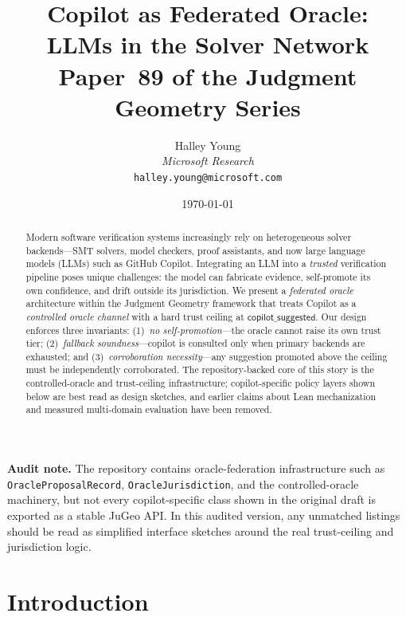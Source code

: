 \documentclass[11pt]{article}
\title{\textbf{Copilot as Federated Oracle:\\
LLMs in the Solver Network}\\[6pt]
{\large Paper~89 of the Judgment Geometry Series}}
\author{Halley Young \\
\textit{Microsoft Research} \\
\texttt{halley.young@microsoft.com}}
\date{\today}
\newcommand{\copilottrust}{$\mathsf{copilot\_suggested}$}
\begin{document}
\maketitle

\noindent\textbf{Audit note.}
The repository contains oracle-federation infrastructure such as
\texttt{OracleProposalRecord}, \texttt{OracleJurisdiction}, and the
controlled-oracle machinery, but not every copilot-specific class shown
in the original draft is exported as a stable JuGeo API.  In this
audited version, any unmatched listings should be read as simplified
interface sketches around the real trust-ceiling and jurisdiction logic.


\begin{abstract}
Modern software verification systems increasingly rely on heterogeneous
solver backends---SMT solvers, model checkers, proof assistants, and
now large language models (LLMs) such as GitHub Copilot.  Integrating
an LLM into a \emph{trusted} verification pipeline poses unique
challenges: the model can fabricate evidence, self-promote its own
confidence, and drift outside its jurisdiction.  We present a
\emph{federated oracle} architecture within the Judgment Geometry
framework that treats Copilot as a \emph{controlled oracle channel}
with a hard trust ceiling at \copilottrust{}.  Our design enforces
three invariants: (1)~\emph{no self-promotion}---the oracle cannot
raise its own trust tier; (2)~\emph{fallback soundness}---copilot is
consulted only when primary backends are exhausted; and
(3)~\emph{corroboration necessity}---any suggestion promoted above
the ceiling must be independently corroborated.  The repository-backed
core of this story is the controlled-oracle and trust-ceiling
infrastructure; copilot-specific policy layers shown below are best read
as design sketches, and earlier claims about Lean mechanization and
measured multi-domain evaluation have been removed.
\end{abstract}


\section{Introduction}\label{sec:intro}
\end{document}
